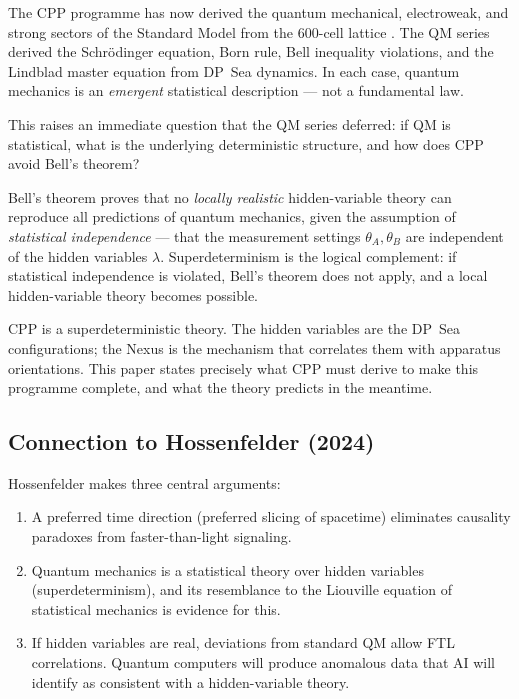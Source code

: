 \documentclass[11pt,a4paper]{article}
\begin{document}
The CPP programme has now derived the quantum mechanical, electroweak,
and strong sectors of the Standard Model from the 600-cell lattice
\citep{cpp_qm_series,cpp_ew_unified,cpp_ss_unified}.  The QM series
derived the Schrödinger equation, Born rule, Bell inequality
violations, and the Lindblad master equation from DP~Sea dynamics.
In each case, quantum mechanics is an \emph{emergent} statistical
description --- not a fundamental law.

This raises an immediate question that the QM series deferred: if QM
is statistical, what is the underlying deterministic structure, and
how does CPP avoid Bell's theorem?

Bell's theorem proves that no \emph{locally realistic} hidden-variable
theory can reproduce all predictions of quantum mechanics, given the
assumption of \emph{statistical independence} --- that the measurement
settings $\theta_A, \theta_B$ are independent of the hidden variables
$\lambda$.  Superdeterminism is the logical complement: if statistical
independence is violated, Bell's theorem does not apply, and a local
hidden-variable theory becomes possible.

CPP is a superdeterministic theory.  The hidden variables are the
DP~Sea configurations; the Nexus is the mechanism that correlates
them with apparatus orientations.  This paper states precisely what
CPP must derive to make this programme complete, and what the theory
predicts in the meantime.

\subsection{Connection to Hossenfelder (2024)}

Hossenfelder \citep{hossenfelder2024} makes three central arguments:

\begin{enumerate}
\item A preferred time direction (preferred slicing of spacetime)
  eliminates causality paradoxes from faster-than-light signaling.
\item Quantum mechanics is a statistical theory over hidden variables
  (superdeterminism), and its resemblance to the Liouville equation
  of statistical mechanics is evidence for this.
\item If hidden variables are real, deviations from standard QM
  allow FTL correlations.  Quantum computers will produce anomalous
  data that AI will identify as consistent with a hidden-variable
  theory.
\end{enumerate}
\end{document}
